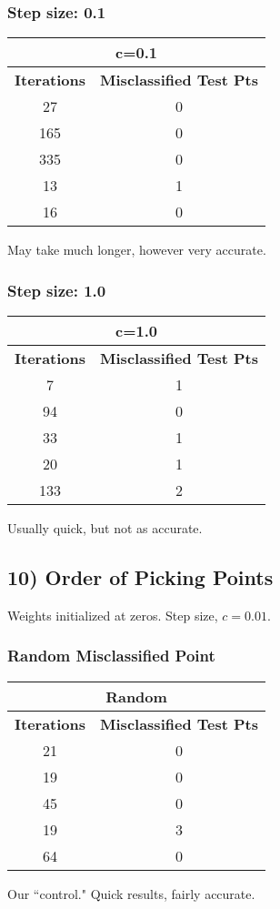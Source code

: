 \documentclass{article}
\begin{document}
\subsubsection*{Step size: 0.1}
\begin{center}
\begin{tabular}{|c|c|}
	\hline
	\multicolumn{2}{|c|}{\textbf{c=0.1}} \\\hline
	\textbf{Iterations} & \textbf{Misclassified Test Pts} \\\hline
	27 & 0 \\
	165 & 0\\
	335 & 0 \\
	13 & 1\\
	16 & 0\\
	\hline
\end{tabular}
\end{center}
May take much longer, however very accurate.

\subsubsection*{Step size: 1.0}
\begin{center}
\begin{tabular}{|c|c|}
	\hline
	\multicolumn{2}{|c|}{\textbf{c=1.0}} \\\hline
	\textbf{Iterations} & \textbf{Misclassified Test Pts} \\\hline
	7 & 1 \\
	94 & 0\\
	33 & 1 \\
	20 & 1\\
	133 & 2\\
	\hline
\end{tabular}
\end{center}
Usually quick, but not as accurate.

\newpage
\subsection*{10) Order of Picking Points}
Weights initialized at zeros. Step size, $c = 0.01$.


\subsubsection*{Random Misclassified Point}
\begin{center}
\begin{tabular}{|c|c|}
	\hline
	\multicolumn{2}{|c|}{\textbf{Random}} \\\hline
	\textbf{Iterations} & \textbf{Misclassified Test Pts} \\\hline
	21 & 0 \\
	19 & 0\\
	45 & 0 \\
	19 & 3\\
	64 & 0\\
	\hline
\end{tabular}
\end{center}
Our ``control." Quick results, fairly accurate.
\end{document}
